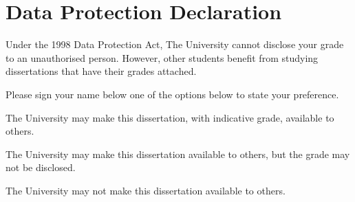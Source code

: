 \section*{Data Protection Declaration}
\vspace{0.5cm}
	\begin{flushleft}
		Under the 1998 Data Protection Act, The University cannot disclose your grade to an unauthorised person. However, other students benefit from studying dissertations that have their grades attached. \newline
		\vspace{0.5cm}
		
		Please sign your name below one of the options below to state your preference.\newline
		\vspace{0.5cm}
		
		The University may make this dissertation, with indicative grade, available to others.\newline
		\vspace{3cm}
		
		The University may make this dissertation available to others, but the grade may not be disclosed.\newline
		\vspace{3cm}
		
		The University may not make this dissertation available to others.\newline
	\end{flushleft}
\pagebreak
